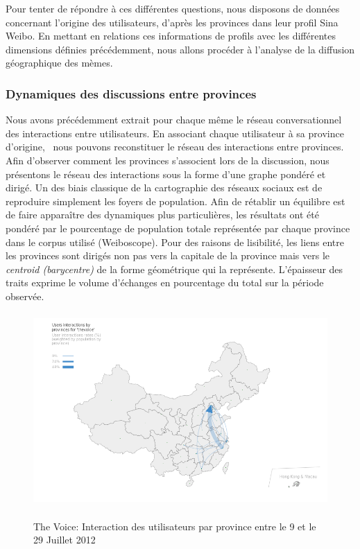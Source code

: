 Pour tenter de r\'epondre \`a ces diff\'erentes questions, nous
disposons de donn\'ees concernant l{\textquoteright}origine des
utilisateurs, d{\textquoteright}apr\`es les provinces dans leur profil
Sina Weibo. En mettant en relations ces informations de profils avec
les diff\'erentes dimensions d\'efinies pr\'ec\'edemment, nous allons
proc\'eder \`a l{\textquoteright}analyse de la diffusion g\'eographique
des m\`emes.

\subsubsection{ Dynamiques des discussions entre provinces}
Nous avons pr\'ec\'edemment extrait pour chaque m\^eme le r\'eseau
conversationnel des interactions entre utilisateurs. En associant
chaque utilisateur \`a sa province d{\textquoteright}origine, \ nous
pouvons reconstituer le r\'eseau des interactions entre provinces. Afin
d{\textquoteright}observer comment les provinces
s{\textquoteright}associent lors de la discussion, nous pr\'esentons le
r\'eseau des interactions sous la forme d{\textquoteright}une graphe
pond\'er\'e et dirig\'e. Un des biais classique de la cartographie des
r\'eseaux sociaux est de reproduire simplement les foyers de
population. Afin de r\'etablir un \'equilibre est de faire appara\^itre
des dynamiques plus particuli\`eres, les r\'esultats ont \'et\'e
pond\'er\'e par le pourcentage de population totale repr\'esent\'ee par
chaque province dans le corpus utilis\'e (Weiboscope). Pour des raisons
de lisibilit\'e, les liens entre les provinces sont dirig\'es non pas
vers la capitale de la province mais vers le \textit{centroid
(barycentre) }de la forme g\'eom\'etrique qui la repr\'esente.
L{\textquoteright}\'epaisseur des traits exprime le volume
d{\textquoteright}\'echanges en pourcentage du total sur la p\'eriode
observ\'ee.

\begin{figure}[H]
    \centering

    \includegraphics[width=4.6606in,height=2.913in]{figures/chap4/chapitre4-img19.png}
    \label{fig:geo-voice-t1}
    \caption{
      The Voice: Interaction des utilisateurs par province entre le 9 et le 29 Juillet 2012
    }
\end{figure}

